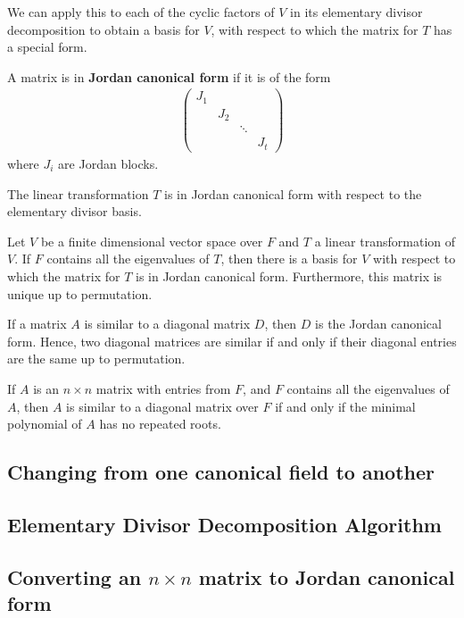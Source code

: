 \documentclass{memoir}
\begin{document}
We can apply this to each of the cyclic factors of \(V\) in its elementary divisor decomposition to obtain a basis for \(V\), with respect to which the matrix for \(T\) has a special form.

\begin{defn}
	A matrix is in \textbf{Jordan canonical form} if it is of the form
\begin{align*}
	\begin{pmatrix} 
	J_1 & & &\\
	    & J_2 & & \\
	    & & \ddots & \\
	    & & & J_t
	\end{pmatrix} 
\end{align*}
where \(J_i\) are Jordan blocks.
\end{defn}
The linear transformation \(T\) is in Jordan canonical form with respect to the elementary divisor basis.

\begin{thm}
	Let \(V\) be a finite dimensional vector space over \(F \) and \(T\) a linear transformation of \(V\). If \(F\) contains all the eigenvalues of \(T\), then there is a basis for \(V\) with respect to which the matrix for \(T\) is in Jordan canonical form. Furthermore, this matrix is unique up to permutation.
\end{thm}

\begin{cor}
	If a matrix \(A\) is similar to a diagonal matrix \(D\), then \(D\) is the Jordan canonical form. Hence, two diagonal matrices are similar if and only if their diagonal entries are the same up to permutation.
\end{cor}

\begin{cor}
	If \(A\) is an \(n\times n\) matrix with entries from \(F\), and \(F\) contains all the eigenvalues of \(A\), then \(A\) is similar to a diagonal matrix over \(F\) if and only if the minimal polynomial of \(A\) has no repeated roots.
\end{cor}

\begin{exmp}
	
\end{exmp}

\subsection{Changing from one canonical field to another}
\label{sub:changing_from_one_canonical_field_to_another}

\subsection{Elementary Divisor Decomposition Algorithm}
\label{sub:elementary_divisor_decomposition_algorithm}

\subsection{Converting an \(n\times n\) matrix to Jordan canonical form}
\label{sub:converting_an_n_by_n_matrix_to_Jordan_canonical_form}




\end{document}
